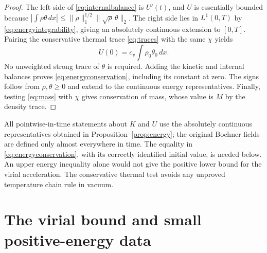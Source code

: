 \documentclass[11pt,letterpaper]{article}
\numberwithin{equation}{section}
\theoremstyle{definition}
\newcommand{\dd}{\,dx}
\newcommand{\norm}[2]{\lVert#1\rVert_{#2}}
\begin{document}
\begin{proof}
The left side of \eqref{eq:internalbalance} is $U'(t)$, and
$U$ is essentially bounded because
$\left|\int\rho\theta\dd\right|
\le\norm{\rho}{1}^{1/2}\norm{\sqrt\rho\,\theta}{2}$.
The right side lies in $L^1(0,T)$ by
\eqref{eq:energyintegrability}, giving an absolutely continuous
extension to $[0,T]$. Pairing the conservative thermal trace
\eqref{eq:traces} with the same $\chi$ yields
\[
 U(0)=c_v\int\rho_0\theta_0\dd.
\]
No unweighted strong trace of $\theta$ is required.
Adding the kinetic and internal balances proves
\eqref{eq:energyconservation}, including its constant at zero.
The signs follow from $\rho,\theta\ge0$ and extend to the
continuous energy representatives. Finally, testing
\eqref{eq:mass} with $\chi$ gives conservation of mass, whose
value is $M$ by the density trace.
\end{proof}

All pointwise-in-time statements about $K$ and $U$ use the absolutely
continuous representatives obtained in Proposition~\ref{prop:energy};
the original Bochner fields are defined only almost everywhere in time.
The equality in \eqref{eq:energyconservation}, with its correctly
identified initial value, is needed below. An upper energy
inequality alone would not give the positive lower bound for the
virial acceleration. The conservative thermal test avoids any
unproved temperature chain rule in vacuum.

\section{The virial bound and small positive-energy data}\label{sec:virial}
\end{document}
